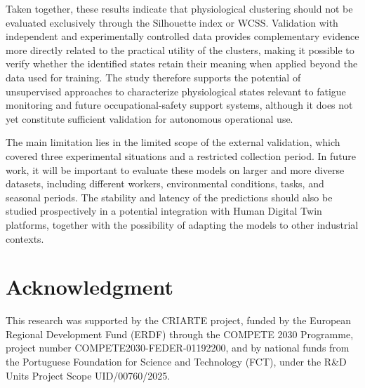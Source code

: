\documentclass[a4paper,fleqn]{cas-sc}
\begin{document}
Taken together, these results indicate that physiological clustering should not be evaluated exclusively through the Silhouette index or WCSS. Validation with independent and experimentally controlled data provides complementary evidence more directly related to the practical utility of the clusters, making it possible to verify whether the identified states retain their meaning when applied beyond the data used for training. The study therefore supports the potential of unsupervised approaches to characterize physiological states relevant to fatigue monitoring and future occupational-safety support systems, although it does not yet constitute sufficient validation for autonomous operational use.

The main limitation lies in the limited scope of the external validation, which covered three experimental situations and a restricted collection period. In future work, it will be important to evaluate these models on larger and more diverse datasets, including different workers, environmental conditions, tasks, and seasonal periods. The stability and latency of the predictions should also be studied prospectively in a potential integration with Human Digital Twin platforms, together with the possibility of adapting the models to other industrial contexts.

\section*{Acknowledgment}

This research was supported by the CRIARTE project, funded by the European Regional Development Fund (ERDF) through the COMPETE 2030 Programme, project number COMPETE2030-FEDER-01192200, and by national funds from the Portuguese Foundation for Science and Technology (FCT), under the R\&D Units Project Scope UID/00760/2025.


\end{document}

